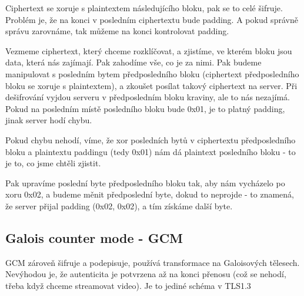 Ciphertext se xoruje s plaintextem následujícího bloku, pak se to celé šifruje. Problém je, že na konci v posledním ciphertextu bude padding. A pokud správně správu zarovnáme, tak můžeme na konci kontrolovat padding.

Vezmeme ciphertext, který chceme rozklíčovat, a zjistíme, ve kterém bloku jsou data, která nás zajímají. Pak zahodíme vše, co je za nimi. Pak budeme manipulovat s posledním bytem předposledního bloku (ciphertext předposledního bloku se xoruje s plaintextem), a zkoušet posílat takový ciphertext na server. Při dešifrování vyjdou serveru v předposledním bloku kraviny, ale to nás nezajímá. Pokud na posledním místě posledního bloku bude 0x01, je to platný padding, jinak server hodí chybu.

Pokud chybu nehodí, víme, že xor posledních bytů v ciphertextu předposledního bloku a plaintextu paddingu (tedy 0x01) nám dá plaintext posledního bloku - to je to, co jsme chtěli zjistit.

Pak upravíme poslední byte předposledního bloku tak, aby nám vycházelo po xoru 0x02, a budeme měnit předposlední byte, dokud to neprojde - to znamená, že server přijal padding (0x02, 0x02), a tím získáme další byte.


\subsection{Galois counter mode - GCM}

GCM zároveň šifruje a podepisuje, používá transformace na Galoisových tělesech. Nevýhodou je, že autenticita je potvrzena až na konci přenosu (což se nehodí, třeba když chceme streamovat video). Je to jediné schéma v TLS1.3

